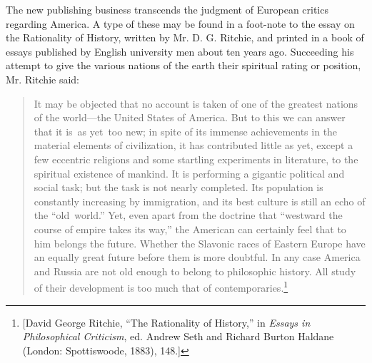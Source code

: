\documentclass[openany,nobib]{tufte-book}
\begin{document}
The new publishing business transcends the judgment of European critics
regarding America. A type of these may be found in a foot-note to the
essay on the Rationality of History, written by Mr. D. G. Ritchie, and
printed in a book of essays published by English university men about
ten years ago. Succeeding his attempt to give the various nations of the
earth their spiritual rating or position, Mr. Ritchie said:

\begin{quote}
It may be objected that no account is taken of one of the greatest
nations of the world---the United States of America. But to this we can
answer that it is~as yet~too new; in spite of its immense achievements
in the material elements of civilization, it has contributed little as
yet, except a few eccentric religions and some startling experiments in
literature, to the spiritual existence of mankind. It is performing a
gigantic political and social task; but the task is not nearly
completed. Its population is constantly increasing by immigration, and
its best culture is still an echo of the ``old~world.'' Yet, even apart
from the doctrine that ``westward the course of empire takes its way,''
the American can certainly feel that to him belongs the future. Whether
the Slavonic races of Eastern Europe have an equally great future before
them is more doubtful. In any case America and Russia are not old enough
to belong to philosophic history. All study of their development is too
much that of contemporaries.\footnote{{[}David George Ritchie, ``The
  Rationality of History,'' in \emph{Essays in Philosophical Criticism},
  ed. Andrew Seth and Richard Burton Haldane (London: Spottiswoode,
  1883), 148.{]}}~
\end{quote}
\end{document}
